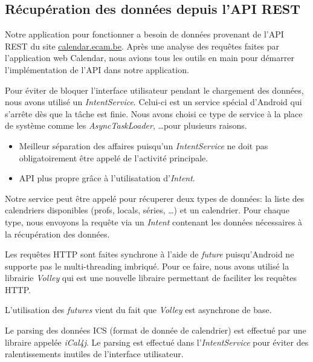\documentclass{article}
\begin{document}
        \subsection{Récupération des données depuis l'API REST}
            Notre application pour fonctionner a besoin de données provenant de l'API REST du site
            \url{calendar.ecam.be}. Après une analyse des requêtes faites par l'application web
            Calendar, nous avions tous les outils en main pour démarrer l'implémentation de l'API
            dans notre application.

            Pour éviter de bloquer l'interface utilisateur pendant le chargement des données, nous
            avons utilisé un \textit{IntentService}. Celui-ci est un service spécial d'Android qui
            s'arrête dès que la tâche est finie. Nous avons choisi ce type de service à la place de
            système comme les \textit{AsyncTaskLoader}, \ldots pour plusieurs raisons.
            \begin{itemize}
                \item Meilleur séparation des affaires puisqu'un \textit{IntentService} ne doit pas
                    obligatoirement être appelé de l'activité principale.
                \item API plus propre grâce à l'utilisatation d'\textit{Intent}.
            \end{itemize}

            Notre service peut être appelé pour récuperer deux types de données: la liste des
            calendriers disponibles (profs, locals, séries, \ldots) et un calendrier. Pour chaque
            type, nous envoyons la requête via un \textit{Intent} contenant les données nécessaires
            à la récupération des données.

            Les requêtes HTTP sont faites synchrone à l'aide de \textit{future} puisqu'Android ne
            supporte pas le multi-threading imbriqué. Pour ce faire, nous avons utilisé la librairie
            \textit{Volley} qui est une nouvelle libraire permettant de faciliter les requêtes HTTP.

            L'utilisation des \textit{futures} vient du fait que \textit{Volley} est asynchrone de
            base.

            Le parsing des données ICS (format de donnée de calendrier) est effectué par une
            libraire appelée \textit{iCal4j}. Le parsing est effectué dans l'\textit{IntentService}
            pour éviter des ralentissements inutiles de l'interface utilisateur.
\end{document}
